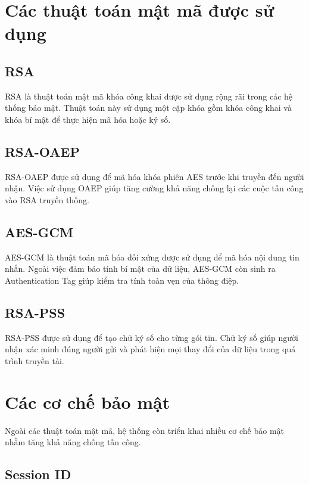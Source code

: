 \section{Các thuật toán mật mã được sử dụng}

\subsection{RSA}

RSA là thuật toán mật mã khóa công khai được sử dụng rộng rãi trong các hệ thống bảo mật. Thuật toán này sử dụng một cặp khóa gồm khóa công khai và khóa bí mật để thực hiện mã hóa hoặc ký số.

\subsection{RSA-OAEP}

RSA-OAEP được sử dụng để mã hóa khóa phiên AES trước khi truyền đến người nhận. Việc sử dụng OAEP giúp tăng cường khả năng chống lại các cuộc tấn công vào RSA truyền thống.

\subsection{AES-GCM}

AES-GCM là thuật toán mã hóa đối xứng được sử dụng để mã hóa nội dung tin nhắn. Ngoài việc đảm bảo tính bí mật của dữ liệu, AES-GCM còn sinh ra Authentication Tag giúp kiểm tra tính toàn vẹn của thông điệp.

\subsection{RSA-PSS}

RSA-PSS được sử dụng để tạo chữ ký số cho từng gói tin. Chữ ký số giúp người nhận xác minh đúng người gửi và phát hiện mọi thay đổi của dữ liệu trong quá trình truyền tải.

\section{Các cơ chế bảo mật}

Ngoài các thuật toán mật mã, hệ thống còn triển khai nhiều cơ chế bảo mật nhằm tăng khả năng chống tấn công.

\subsection{Session ID}

